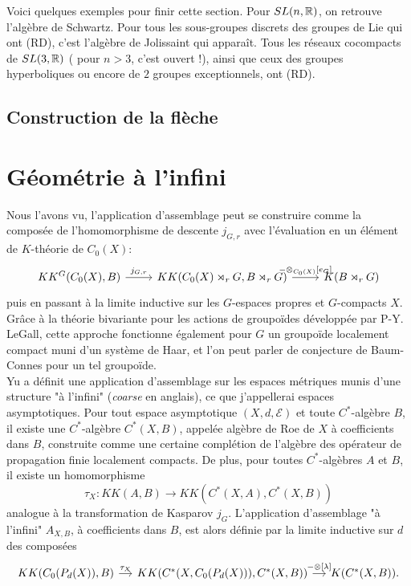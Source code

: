 Voici quelques exemples pour finir cette section. Pour $SL(n,\mathbb R)$, on retrouve l'algèbre de Schwartz. Pour tous les sous-groupes discrets des groupes de Lie qui ont (RD), c'est l'algèbre de Jolissaint qui apparaît. Tous les réseaux cocompacts de $SL(3,\mathbb R)$ ( pour $n> 3$, c'est ouvert !), ainsi que ceux des groupes hyperboliques ou encore de $2$ groupes exceptionnels, ont (RD).  

\subsection{Construction de la flèche}
\section{Géométrie à l'infini}

Nous l'avons vu, l'application d'assemblage peut se construire comme la composée de l'homomorphisme de descente $j_{G,r}$ avec l'évaluation en un élément de $K$-théorie de $C_0(X)$:
\[\begin{tikzcd}
KK^G(C_0(X),B)\arrow{r}{j_{G,r}}& KK(C_0(X)\rtimes_r G,B \rtimes_r G) \arrow{r}{-\otimes_{C_0(X)} [e_G]} & K(B\rtimes_r G) 
\end{tikzcd}\]
puis en passant à la limite inductive sur les $G$-espaces propres et $G$-compacts $X$. Grâce à la théorie bivariante pour les actions de groupoïdes développée par P-Y. LeGall, cette approche fonctionne également pour $G$ un groupoïde localement compact muni d'un système de Haar, et l'on peut parler de conjecture de Baum-Connes pour un tel groupoïde.  \\

Yu a définit une application d'assemblage sur les espaces métriques munis d'une structure "à l'infini" (\textit{coarse} en anglais), ce que j'appellerai espaces asymptotiques. Pour tout espace asymptotique $(X,d,\mathcal E)$ et toute $C^*$-algèbre $B$, il existe une $C^*$-algèbre $C^*(X,B)$, appelée algèbre de Roe de $X$ à coefficients dans $B$, construite comme une certaine complétion de l'algèbre des opérateur de propagation finie localement compacts. De plus, pour toutes $C^*$-algèbres $A$ et $B$, il existe un homomorphisme
\[\tau_X : KK(A,B)\rightarrow KK(C^*(X,A),C^*(X,B))\]
analogue à la transformation de Kasparov $j_G$. L'application d'assemblage "à l'infini" $A_{X,B}$, à coefficients dans $B$, est alors définie par la limite inductive sur $d$ des composées
\[\begin{tikzcd}[column sep= small]
KK(C_0(P_d(X)),B)\arrow{r}{\tau_X}& KK(C^*(X,C_0(P_d(X))),C^*(X,B)) \arrow{r}{-\otimes [\lambda]} & K(C^*(X,B)) .
\end{tikzcd}\]

